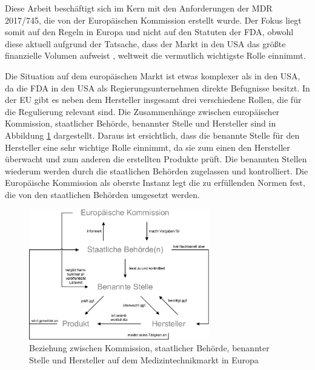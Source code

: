 \documentclass[a4paper,12pt]{report}
\begin{document}
Diese Arbeit beschäftigt sich im Kern mit den Anforderungen der \ac{MDR} 2017/745, die von der Europäischen Kommission erstellt wurde. Der Fokus liegt somit auf den Regeln in Europa und nicht auf den Statuten der FDA, obwohl diese aktuell aufgrund der Tatsache, dass der Markt in den USA das größte finanzielle Volumen aufweist \citep[vgl.][S. 8]{ITA2016}, weltweit die vermutlich wichtigste Rolle einnimmt.

Die Situation auf dem europäischen Markt ist etwas komplexer als in den USA, da die FDA in den USA als Regierungsunternehmen direkte Befugnisse besitzt. In der EU gibt es neben dem Hersteller insgesamt drei verschiedene Rollen, die für die Regulierung relevant sind. Die Zusammenhänge zwischen europäischer Kommission, staatlicher Behörde, benannter Stelle und Hersteller sind in Abbildung \ref{regulativ_structure_eu} dargestellt. Daraus ist ersichtlich, dass die benannte Stelle für den Hersteller eine sehr wichtige Rolle einnimmt, da sie zum einen den Hersteller überwacht und zum anderen die erstellten Produkte prüft. Die benannten Stellen wiederum werden durch die staatlichen Behörden zugelassen und kontrolliert. Die Europäische Kommission als oberste Instanz legt die zu erfüllenden Normen fest, die von den staatlichen Behörden umgesetzt werden.
\begin{figure}[ht]
\centering
\includegraphics[width=0.7\textwidth]{Images/regulativ_structure_eu}
\caption[Beziehung zwischen Kommission, staatlicher Behörde, benannter Stelle und Hersteller auf dem Medizintechnikmarkt in Europa]{Beziehung zwischen Kommission, staatlicher Behörde, benannter Stelle und Hersteller auf dem Medizintechnikmarkt in Europa \citep[S. 38]{Johner2015}}
\label{regulativ_structure_eu}
\end{figure}
\end{document}
